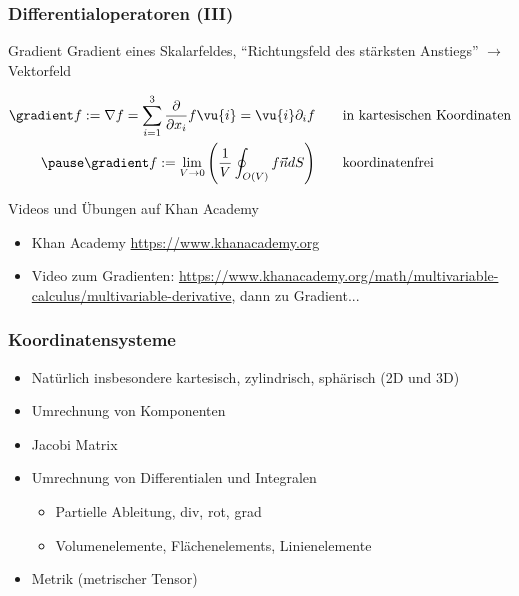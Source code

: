 \begin{frame}
  \frametitle{Differentialoperatoren (III)}

  \begin{block}{Gradient}
    Gradient eines Skalarfeldes,
    \enquote{Richtungsfeld des stärksten Anstiegs} $\to$ Vektorfeld\pause

    \begin{align*}
      \gradient f := \nabla f = \sum_{i=1}^3 \frac{\partial}{\partial x_i}f \vu{i} = \vu{i} \partial_i f & \qquad \text{in kartesischen
                                                                                                              Koordinaten}\\ \pause
      \gradient f := \lim_{V \to 0}\left( \frac{1}{V} \oint_{O(V)} f \vec{n}  dS\right)
                                                                                                            & \qquad\text{koordinatenfrei}
    \end{align*}
  \end{block}\pause

  \begin{block}{Videos und Übungen auf Khan Academy}
    \begin{itemize}
    \item Khan Academy
      \url{https://www.khanacademy.org}
    \item  Video zum Gradienten:
      \url{https://www.khanacademy.org/math/multivariable-calculus/multivariable-derivative},
      dann zu Gradient...
    \end{itemize}
  \end{block}
  
\end{frame}

\begin{frame}
  \frametitle{Koordinatensysteme}
  \begin{itemize}[<+->]
  \item Natürlich insbesondere \alert{kartesisch, zylindrisch, sphärisch} (2D und 3D)
  \item Umrechnung von Komponenten
  \item Jacobi Matrix
  \item Umrechnung von Differentialen und Integralen
    \begin{itemize}
    \item Partielle Ableitung, div, rot, grad
    \item Volumenelemente, Flächenelements, Linienelemente
    \end{itemize}
  \item Metrik (metrischer Tensor)

  \end{itemize}
\end{frame}


